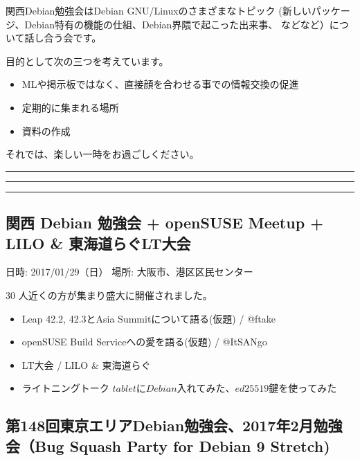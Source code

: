 \documentclass[mingoth,a4paper]{jsarticle}
\begin{document}
\vspace{1em}

関西Debian勉強会はDebian GNU/Linuxのさまざまなトピック
(新しいパッケージ、Debian特有の機能の仕組、Debian界隈で起こった出来事、
などなど）について話し合う会です。

目的として次の三つを考えています。
\begin{itemize}
\item MLや掲示板ではなく、直接顔を合わせる事での情報交換の促進
\item 定期的に集まれる場所
\item 資料の作成
\end{itemize}

それでは、楽しい一時をお過ごしください。

\newpage

\begin{minipage}[b]{0.2\hsize}
  {}
\end{minipage}
\begin{minipage}[b]{0.8\hsize}
\hrule
\vspace{2mm}
\hrule
\setcounter{tocdepth}{1}
\tableofcontents
\vspace{2mm}
\hrule
\end{minipage}


\subsection{関西 Debian 勉強会 + openSUSE Meetup + LILO \& 東海道らぐLT大会}

日時: 2017/01/29（日）
場所: 大阪市、港区区民センター

30 人近くの方が集まり盛大に開催されました。

\begin{itemize}
\item{Leap 42.2, 42.3とAsia Summitについて語る(仮題) / @ftake}
\item{openSUSE Build Serviceへの愛を語る(仮題) / @ItSANgo}
\item{LT大会 / LILO \& 東海道らぐ}
\item{ライトニングトーク \(tablet にDebian 入れてみた、ed25519 鍵を使ってみた\) }
\end{itemize}

\subsection{第148回東京エリアDebian勉強会、2017年2月勉強会（Bug Squash Party for Debian 9 Stretch)}
\end{document}
